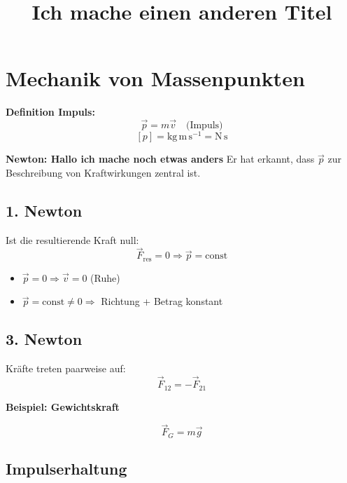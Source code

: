 \documentclass[a4paper,12pt]{article}
\title{\Huge \textbf{Ich mache einen anderen Titel}}
\author{}
\date{}
\begin{document}
\maketitle
\thispagestyle{empty}
\newpage

\tableofcontents
\newpage



\section{Mechanik von Massenpunkten}

\textbf{Definition Impuls:}
\[
\vec{p} = m \vec{v}
\quad \text{(Impuls)}
\]
\[
[p] = \mathrm{kg\, m\, s^{-1}} = \mathrm{N\, s}
\]

\vspace{0.5cm}

\textbf{Newton: Hallo ich mache noch etwas anders}
Er hat erkannt, dass $\vec{p}$ zur Beschreibung von Kraftwirkungen zentral ist.

\subsection*{1. Newton}
Ist die resultierende Kraft null:
\[
\vec{F}_{\text{res}} = 0 \Rightarrow \vec{p} = \text{const}
\]

\begin{itemize}
\item $\vec{p}=0 \Rightarrow \vec{v}=0$ (Ruhe)
\item $\vec{p}=\text{const}\neq0 \Rightarrow$ Richtung + Betrag konstant
\end{itemize}

\subsection*{3. Newton}
Kräfte treten paarweise auf:
\[
\vec{F}_{12} = -\vec{F}_{21}
\]

\textbf{Beispiel: Gewichtskraft}
\begin{center}
\vspace*{0.5cm}
\end{center}
\[
\vec{F}_G = m \vec{g}
\]

\vspace{0.5cm}

\subsection*{Impulserhaltung}
\end{document}
